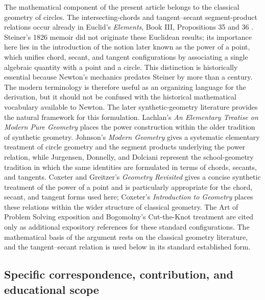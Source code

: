 \documentclass[preprint,12pt,3p,nopreprintline]{elsarticle}
\numberwithin{equation}{section}
\theoremstyle{remark}
\begin{document}
The mathematical component of the present article belongs to the classical geometry of circles. The intersecting-chords and tangent--secant segment-product relations occur already in Euclid's \textit{Elements}, Book III, Propositions 35 and 36 \cite{euclid1956elements}. Steiner's 1826 memoir \cite{steiner1826einige} did not originate these Euclidean results; its importance here lies in the introduction of the notion later known as the power of a point, which unifies chord, secant, and tangent configurations by associating a single algebraic quantity with a point and a circle. This distinction is historically essential because Newton's mechanics predates Steiner by more than a century. The modern terminology is therefore useful as an organizing language for the derivation, but it should not be confused with the historical mathematical vocabulary available to Newton. The later synthetic-geometry literature provides the natural framework for this formulation. Lachlan's \textit{An Elementary Treatise on Modern Pure Geometry} \cite{lachlan1893elementary} places the power construction within the older tradition of synthetic geometry. Johnson's \textit{Modern Geometry} \cite{johnson1929modern} gives a systematic elementary treatment of circle geometry and the segment products underlying the power relation, while Jurgensen, Donnelly, and Dolciani \cite{jurgensen1963modern} represent the school-geometry tradition in which the same identities are formulated in terms of chords, secants, and tangents. Coxeter and Greitzer's \textit{Geometry Revisited} \cite{coxeter1967geometry} gives a concise synthetic treatment of the power of a point and is particularly appropriate for the chord, secant, and tangent forms used here; Coxeter's \textit{Introduction to Geometry} \cite{coxeter1969introduction} places these relations within the wider structure of classical geometry. The Art of Problem Solving exposition \cite{aopsPowerPoint} and Bogomolny's Cut-the-Knot treatment \cite{bogomolnyPowerPoint} are cited only as additional expository references for these standard configurations. The mathematical basis of the argument rests on the classical geometry literature, and the tangent--secant relation is used below in its standard established form.

\subsection{Specific correspondence, contribution, and educational scope}
\end{document}
